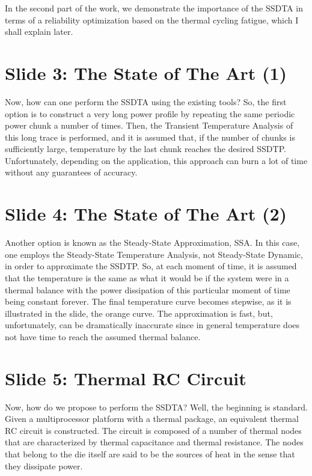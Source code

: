 \documentclass[11pt,a4paper]{article}
\begin{document}
In the second part of the work, we demonstrate the importance of the SSDTA in terms of a reliability optimization based on the thermal cycling fatigue, which I shall explain later.

\section{Slide 3: The State of The Art (1)}
Now, how can one perform the SSDTA using the existing tools? So, the first option is to construct a very long power profile by repeating the same periodic power chunk a number of times. Then, the Transient Temperature Analysis of this long trace is performed, and it is assumed that, if the number of chunks is sufficiently large, temperature by the last chunk reaches the desired SSDTP. Unfortunately, depending on the application, this approach can burn a lot of time without any guarantees of accuracy.

\section{Slide 4: The State of The Art (2)}
Another option is known as the Steady-State Approximation, SSA. In this case, one employs the Steady-State Temperature Analysis, not Steady-State Dynamic, in order to approximate the SSDTP. So, at each moment of time, it is assumed that the temperature is the same as what it would be if the system were in a thermal balance with the power dissipation of this particular moment of time being constant forever. The final temperature curve becomes stepwise, as it is illustrated in the slide, the orange curve. The approximation is fast, but, unfortunately, can be dramatically inaccurate since in general temperature does not have time to reach the assumed thermal balance.

\section{Slide 5: Thermal RC Circuit}
Now, how do we propose to perform the SSDTA? Well, the beginning is standard. Given a multiprocessor platform with a thermal package, an equivalent thermal RC circuit is constructed. The circuit is composed of a number of thermal nodes that are characterized by thermal capacitance and thermal resistance. The nodes that belong to the die itself are said to be the sources of heat in the sense that they dissipate power.
\end{document}
